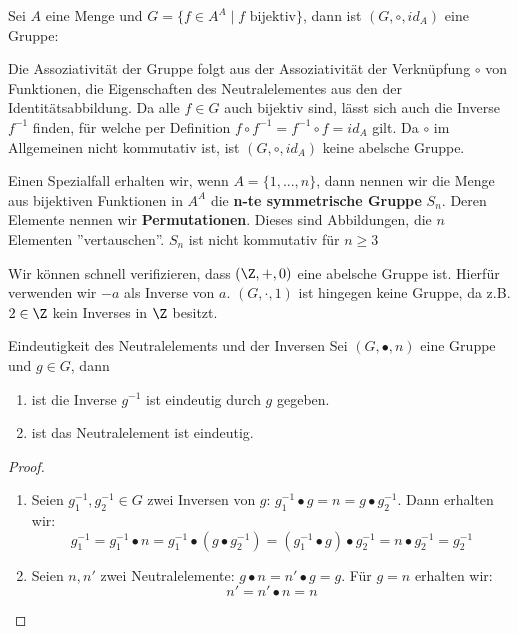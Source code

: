 \begin{example} Sei $A$ eine Menge und $G = \{f \in A^A \mid f \text{ bijektiv}\}$, dann ist $(G, \circ, id_A)$ eine Gruppe:

Die Assoziativität der Gruppe folgt aus der Assoziativität der Verknüpfung $\circ$ von Funktionen, die Eigenschaften des Neutralelementes aus den der Identitätsabbildung. Da alle $f\in G$ auch bijektiv sind, lässt sich auch die Inverse $f^{-1}$ finden, für welche per Definition $f \circ f^{-1} = f^{-1} \circ f = id_A$ gilt. Da $\circ$ im Allgemeinen nicht kommutativ ist, ist $(G, \circ, id_A)$ keine abelsche Gruppe.

Einen Spezialfall erhalten wir, wenn $A = \{1, ..., n\}$, dann nennen wir die Menge aus bijektiven Funktionen in $A^A$ die \textbf{n-te symmetrische Gruppe} $S_n$. Deren Elemente nennen wir \textbf{Permutationen}. Dieses sind Abbildungen, die $n$ Elementen ''vertauschen''. $S_n$ ist nicht kommutativ für $n \geq 3$
\end{example}

\begin{example} Wir können schnell verifizieren, dass $(\Z, +, 0)$ eine abelsche Gruppe ist. Hierfür verwenden wir $-a$ als Inverse von $a$. $(G, \cdot, 1)$ ist hingegen keine Gruppe, da z.B. $2 \in \Z$ kein Inverses in $\Z$ besitzt.
\end{example}

\begin{satz}{Eindeutigkeit des Neutralelements und der Inversen}{} Sei $(G, \bullet, n)$ eine Gruppe und $g \in G$, dann
\begin{enumerate}
    \item ist die Inverse $g^{-1}$ ist eindeutig durch $g$ gegeben.
    \item ist das Neutralelement ist eindeutig.
\end{enumerate}
\end{satz}

\begin{proof} {\ }
\begin{enumerate}
    \item Seien $g^{-1}_1, g^{-1}_2 \in G$ zwei Inversen von $g$: $g^{-1}_1 \bullet g = n =  g \bullet g^{-1}_2$. Dann erhalten wir:
    $$g^{-1}_1 = g^{-1}_1 \bullet n = g^{-1}_1 \bullet (g \bullet g^{-1}_2) = (g^{-1}_1 \bullet g) \bullet g^{-1}_2 = n \bullet g^{-1}_2 = g^{-1}_2$$
    \item Seien $n,n'$ zwei Neutralelemente: $g \bullet n = n' \bullet g = g$. Für $g = n$ erhalten wir:
    $$n' = n' \bullet n = n$$
\end{enumerate}

\end{proof}

